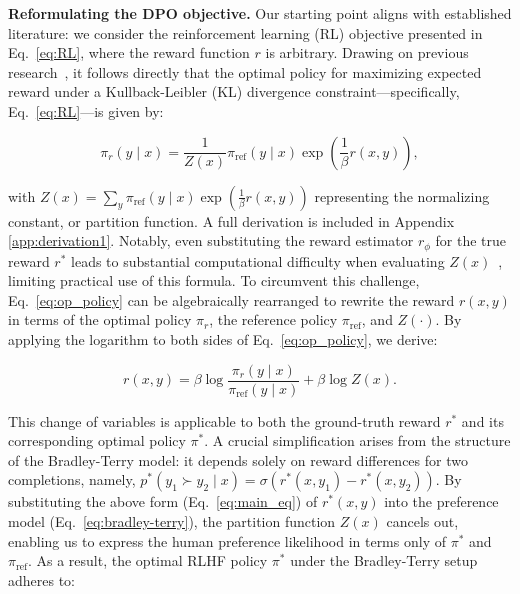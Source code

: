 \textbf{Reformulating the DPO objective.} Our starting point aligns with established literature: we consider the reinforcement learning (RL) objective presented in Eq.~\ref{eq:RL}, where the reward function $r$ is arbitrary. Drawing on previous research~\citep{peters2007reinforcement, peng2019advantage, korbak2022reinforcement, go2023aligning}, it follows directly that the optimal policy for maximizing expected reward under a Kullback-Leibler (KL) divergence constraint—specifically, Eq.~\ref{eq:RL}—is given by:

\begin{equation}\label{eq:op_policy}
    \pi_r(y\mid x) = \frac{1}{Z(x)}\pi_\text{ref}(y\mid x)\exp\left(\frac{1}{\beta}r(x, y)\right),
\end{equation}

with $Z(x) =\sum_{y}\pi_\text{ref}(y\mid x)\exp\left(\frac{1}{\beta}r(x, y)\right)$ representing the normalizing constant, or partition function. A full derivation is included in Appendix \ref{app:derivation1}. Notably, even substituting the reward estimator $r_{\phi}$ for the true reward $r^*$ leads to substantial computational difficulty when evaluating $Z(x)$~\citep{korbak2022reinforcement, go2023aligning}, limiting practical use of this formula. To circumvent this challenge, Eq.~\ref{eq:op_policy} can be algebraically rearranged to rewrite the reward $r(x, y)$ in terms of the optimal policy $\pi_r$, the reference policy $\pi_\text{ref}$, and $Z(\cdot)$. By applying the logarithm to both sides of Eq.~\ref{eq:op_policy}, we derive:

\begin{equation}\label{eq:main_eq}
    r(x,y) =\beta \log \frac{\pi_r(y\mid x)}{\pi_\text{ref}(y\mid x)} + \beta \log Z(x).
\end{equation}

This change of variables is applicable to both the ground-truth reward $r^*$ and its corresponding optimal policy $\pi^*$. A crucial simplification arises from the structure of the Bradley-Terry model: it depends solely on reward differences for two completions, namely, ${p^*(y_1 \succ y_2 \mid x) = \sigma(r^*(x, y_1) - r^*(x, y_2))}$. By substituting the above form (Eq.~\ref{eq:main_eq}) of $r^*(x, y)$ into the preference model (Eq.~\ref{eq:bradley-terry}), the partition function $Z(x)$ cancels out, enabling us to express the human preference likelihood in terms only of $\pi^*$ and $\pi_\text{ref}$. As a result, the optimal RLHF policy $\pi^*$ under the Bradley-Terry setup adheres to:

